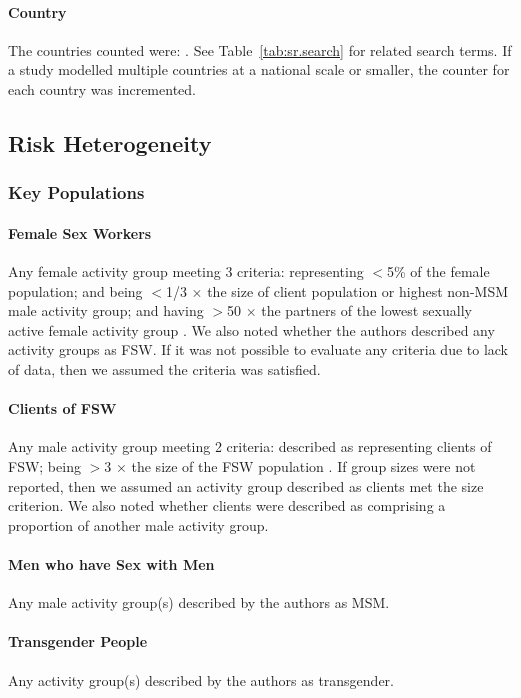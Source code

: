 \paragraph{Country}
The countries counted were: \emph{\srcountries}.
See Table~\ref{tab:sr.search} for related search terms.
If a study modelled multiple countries at a national scale or smaller,
the counter for each country was incremented.
\subsection{Risk Heterogeneity}
\label{aa:defs:risk}
\subsubsection{Key Populations}
\label{aaa:defs:kp}
\paragraph{Female Sex Workers}
Any female activity group meeting 3 criteria:
representing {$<$5\%} of the female population; and
being {$<$1/3 $\times$} the size of client population or highest non-MSM male activity group; and
having {$>$50 $\times$} the partners of the lowest sexually active female activity group
\cite{Vandepitte2006,Carael2006,Scorgie2012}.
We also noted whether the authors described any activity groups as FSW.
If it was not possible to evaluate any criteria due to lack of data,
then we assumed the criteria was satisfied.
\paragraph{Clients of FSW}
Any male activity group meeting 2 criteria:
described as representing clients of FSW;
being {$>$3 $\times$} the size of the FSW population \cite{Carael2006}.
If group sizes were not reported,
then we assumed an activity group described as clients met the size criterion.
We also noted whether clients were described as
comprising a proportion of another male activity group.
\paragraph{Men who have Sex with Men}
Any male activity group(s) described by the authors as MSM.
\paragraph{Transgender People}
Any activity group(s) described by the authors as transgender.
